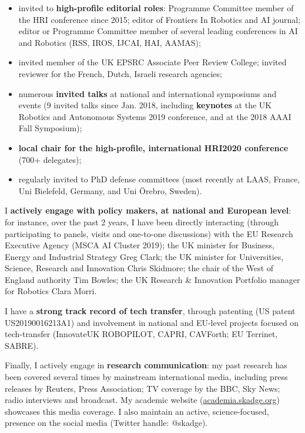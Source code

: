 \begin{itemize}[noitemsep,topsep=0pt,parsep=0pt,partopsep=0pt]
    \item invited to \textbf{high-profile editorial roles}: Programme Committee member of the HRI
conference since 2015; editor of Frontiers In Robotics and AI journal; editor or
Programme Committee member of several leading conferences in AI and Robotics
        (RSS, IROS, IJCAI, HAI, AAMAS);
    \item invited member of the UK EPSRC Associate Peer Review College;
        invited reviewer for the French, Dutch, Israeli research agencies;
    \item numerous \textbf{invited talks} at national and international symposiums and
        events (9 invited talks since Jan. 2018, including \textbf{keynotes} at the UK Robotics
and Autonomous Systems 2019 conference, and at the 2018 AAAI Fall Symposium);
    \item \textbf{local chair for the high-profile, international HRI2020
        conference} (700+ delegates);
    \item regularly invited to PhD defense committees (most recently at
        LAAS, France, Uni Bielefeld, Germany, and Uni Örebro, Sweden).
\end{itemize}


\vspace{1em} 

I \textbf{actively engage with policy makers, at national and European
level}: for instance, over the past 2 years, I have been directly interacting
(through participating to panels, visits and one-to-one discussions) with the EU
Research Executive Agency (MSCA AI Cluster 2019); the UK minister for Business,
Energy and Industrial Strategy Greg Clark; the UK minister for Universities,
Science, Research and Innovation Chris Skidmore; the chair of the West of
England authority Tim Bowles; the UK Research \& Innovation Portfolio
manager for Robotics Clara Morri.

I have a \textbf{strong track record of tech transfer}, through patenting (US patent
US20190016213A1) and involvement in national and EU-level projects focused on
tech-transfer (InnovateUK ROBOPILOT, CAPRI, CAVForth; EU Terrinet, SABRE).

Finally, I actively engage in \textbf{research communication}: my past research has been
covered several times by mainstream international media, including press
releases by Reuters, Press Association; TV coverage by the BBC, Sky News; radio
interviews and broadcast. My academic website (\url{academia.skadge.org})
showcases this media coverage. I also maintain an active, science-focused,
presence on the social media (Twitter handle: @skadge).



